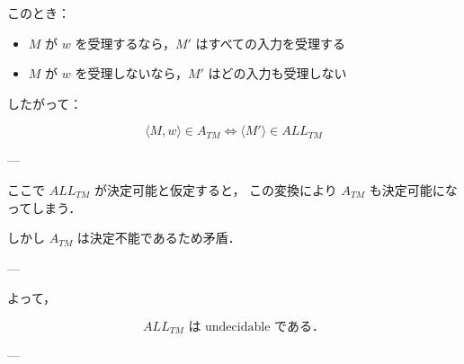 \documentclass[uplatex,a4paper,11pt]{jsarticle}
\begin{document}
このとき：

\begin{itemize}
    \item $M$ が $w$ を受理するなら，$M'$ はすべての入力を受理する
    \item $M$ が $w$ を受理しないなら，$M'$ はどの入力も受理しない
\end{itemize}

したがって：

\[
\langle M, w \rangle \in A_{TM} \iff \langle M' \rangle \in ALL_{TM}
\]

---

ここで $ALL_{TM}$ が決定可能と仮定すると，
この変換により $A_{TM}$ も決定可能になってしまう．

しかし $A_{TM}$ は決定不能であるため矛盾．

---

よって，

\[
ALL_{TM} \text{ は undecidable である．}
\]

---
\end{document}
